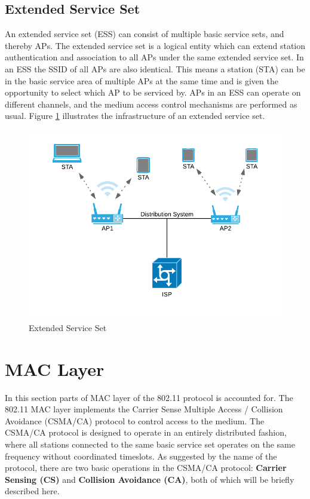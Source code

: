 		\subsection{Extended Service Set}
		An extended service set (ESS) can consist of multiple basic service sets, and thereby APs. The extended service set is a logical entity which can extend station
		authentication and association to all APs under the same extended service set. In an ESS the SSID of all APs are also identical. This means a station (STA) can be in the basic service area of
		multiple APs at the same time and is given the opportunity to select which AP to be serviced by. APs in an ESS can operate on different channels, and the medium access control
		mechanisms are performed as usual. Figure \ref{fig:extendedserviceset} illustrates the infrastructure of an extended service set.  

		 \begin{figure}
			 \center
			 \includegraphics[scale=1]{Images/ESS.png}
			 \caption{Extended Service Set}
			 \label{fig:extendedserviceset}
		 \end{figure}


     \section{MAC Layer}
		 In this section parts of MAC layer of the 802.11 protocol is accounted for.  
     The 802.11 MAC layer implements the Carrier Sense Multiple Access / Collision Avoidance (CSMA/CA) protocol to control access to the medium.
     The CSMA/CA protocol is designed to operate in an entirely distributed fashion, where all stations connected to the same basic service set operates on
     the same frequency without coordinated timeslots. As suggested by the name of the protocol, there are two basic operations in the CSMA/CA protocol:
     \textbf{Carrier Sensing (CS)} and \textbf{Collision Avoidance (CA)}, both of which will be briefly described here.

